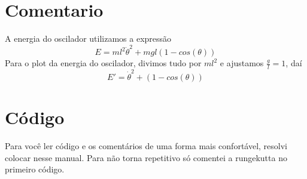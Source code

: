 \documentclass[a4paper,11pt]{article}
\begin{document}
\section*{Comentario}
A energia do oscilador utilizamos a expressão 
\begin{equation}
E = ml^2\dot{\theta}^{2} + mgl(1-cos(\theta))
\end{equation}
Para o plot da energia do oscilador, divimos tudo por $ml^{2}$ e ajustamos $\frac{g}{l} = 1$, daí
\begin{equation}
 E' = \dot{\theta}^{2} + (1-cos(\theta))
\end{equation}
\section*{Código}
Para você ler código e os comentários de uma forma mais confortável, resolvi colocar nesse manual. Para não torna repetitivo só comentei a rungekutta no primeiro código. 





\end{document}
